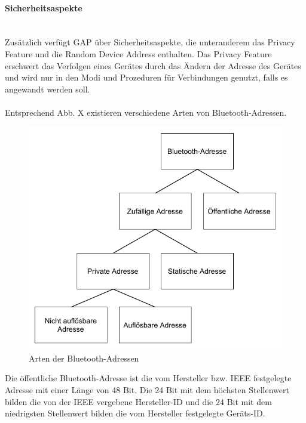 \paragraph{Sicherheitsaspekte} \mbox{} \vspace{0.2cm} \\

Zusätzlich verfügt GAP über Sicherheitsaspekte, die unteranderem das Privacy Feature und die Random Device Address enthalten. Das Privacy Feature erschwert das Verfolgen eines Gerätes durch das Ändern der Adresse des Gerätes und wird nur in den Modi und Prozeduren für Verbindungen genutzt, falls es angewandt werden soll.\\\\

Entsprechend Abb. X existieren verschiedene Arten von Bluetooth-Adressen.
\begin{figure}[hbt!]
    \centering
    \includegraphics{graphics/BT_Adressen_Baum.pdf}
    \caption{Arten der Bluetooth-Adressen}
\end{figure}

Die öffentliche Bluetooth-Adresse ist die vom Hersteller bzw. IEEE festgelegte Adresse mit einer Länge von 48 Bit. Die 24 Bit mit dem höchsten Stellenwert bilden die von der IEEE vergebene Hersteller-ID und die 24 Bit mit dem niedrigsten Stellenwert bilden die vom Hersteller festgelegte Geräts-ID. \cite{BtSpec4.2_2576}

